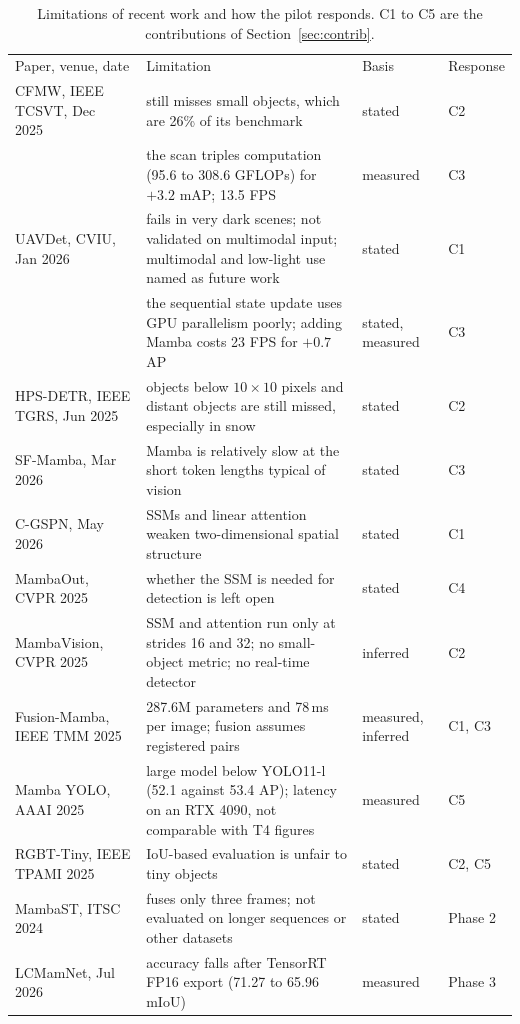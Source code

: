 \documentclass[11pt,a4paper]{article}
\newcommand{\hd}[1]{{\color{muted}#1}}
\newcommand{\gap}{\addlinespace[5pt]}
\newcommand{\sgap}{\addlinespace[3pt]}
\begin{document}
\begin{table}[htbp]
\centering
\caption{Limitations of recent work and how the pilot responds. C1 to C5 are the
contributions of Section~\ref{sec:contrib}.}
\label{tab:lims}
\small
\begin{tabularx}{\textwidth}{@{}P{2.85cm}LP{1.35cm}P{1.25cm}@{}}
\hd{Paper, venue, date} & \hd{Limitation} & \hd{Basis} & \hd{Response} \\ \gap
CFMW, IEEE TCSVT, Dec 2025~\citep{li2025cfmw} & still misses small objects, which are 26\% of its benchmark & stated & C2 \\
 & the scan triples computation (95.6 to 308.6 GFLOPs) for $+3.2$ mAP; 13.5 FPS & measured & C3 \\ \sgap
UAVDet, CVIU, Jan 2026~\citep{yang2026uavdet} & fails in very dark scenes; not validated on multimodal input; multimodal and low-light use named as future work & stated & C1 \\
 & the sequential state update uses GPU parallelism poorly; adding Mamba costs 23 FPS for $+0.7$ AP & stated, measured & C3 \\ \sgap
HPS-DETR, IEEE TGRS, Jun 2025~\citep{wang2025hpsdetr} & objects below $10\times10$ pixels and distant objects are still missed, especially in snow & stated & C2 \\ \sgap
SF-Mamba, Mar 2026~\citep{sfmamba2026} & Mamba is relatively slow at the short token lengths typical of vision & stated & C3 \\ \sgap
C-GSPN, May 2026~\citep{cgspn2026} & SSMs and linear attention weaken two-dimensional spatial structure & stated & C1 \\ \sgap
MambaOut, CVPR 2025~\citep{yu2025mambaout} & whether the SSM is needed for detection is left open & stated & C4 \\ \sgap
MambaVision, CVPR 2025~\citep{hatamizadeh2025mambavision} & SSM and attention run only at strides 16 and 32; no small-object metric; no real-time detector & inferred & C2 \\ \sgap
Fusion-Mamba, IEEE TMM 2025~\citep{dong2025fusionmamba} & 287.6M parameters and 78\,ms per image; fusion assumes registered pairs & measured, inferred & C1, C3 \\ \sgap
Mamba YOLO, AAAI 2025~\citep{wang2025mambayolo} & large model below YOLO11-l (52.1 against 53.4 AP); latency on an RTX 4090, not comparable with T4 figures & measured & C5 \\ \sgap
RGBT-Tiny, IEEE TPAMI 2025~\citep{ying2025rgbttiny} & IoU-based evaluation is unfair to tiny objects & stated & C2, C5 \\ \sgap
MambaST, ITSC 2024~\citep{mambast2024} & fuses only three frames; not evaluated on longer sequences or other datasets & stated & Phase 2 \\ \sgap
LCMamNet, Jul 2026~\citep{lcmamnet2026} & accuracy falls after TensorRT FP16 export (71.27 to 65.96 mIoU) & measured & Phase 3 \\
\end{tabularx}
\end{table}
\end{document}
